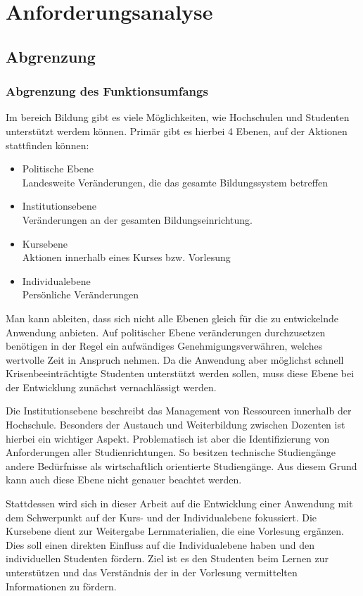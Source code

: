 \chapter{Anforderungsanalyse} %
\section{Abgrenzung}
\subsection{Abgrenzung des Funktionsumfangs}\label{sub:abgrenzung}
Im bereich Bildung gibt es viele Möglichkeiten, wie Hochschulen und Studenten unterstützt werdem können.
Primär gibt es hierbei 4 Ebenen, auf der Aktionen stattfinden können:
\begin{itemize}
    \item Politische Ebene\\
        Landesweite Veränderungen, die das gesamte Bildungssystem betreffen 
    \item Institutionsebene\\
        Veränderungen an der gesamten Bildungseinrichtung.
    \item Kursebene\\
        Aktionen innerhalb eines Kurses bzw. Vorlesung
    \item Individualebene\\
        Persönliche Veränderungen
\end{itemize}
Man kann ableiten, dass sich nicht alle Ebenen gleich für die zu entwickelnde Anwendung anbieten.
Auf politischer Ebene veränderungen durchzusetzen benötigen in der Regel ein aufwändiges Genehmigungsverwähren, welches wertvolle Zeit in Anspruch nehmen.
Da die Anwendung aber möglichst schnell Krisenbeeinträchtigte Studenten unterstützt werden sollen, muss diese Ebene bei der Entwicklung zunächst vernachlässigt werden.

Die Institutionsebene beschreibt das Management von Ressourcen innerhalb der Hochschule.
Besonders der Austauch und Weiterbildung zwischen Dozenten ist hierbei ein wichtiger Aspekt.
Problematisch ist aber die Identifizierung von Anforderungen aller Studienrichtungen.
So besitzen technische Studiengänge andere Bedürfnisse als wirtschaftlich orientierte Studiengänge.
Aus diesem Grund kann auch diese Ebene nicht genauer beachtet werden.

Stattdessen wird sich in dieser Arbeit auf die Entwicklung einer Anwendung mit dem Schwerpunkt auf der Kurs- und der Individualebene fokussiert.
Die Kursebene dient zur Weitergabe Lernmaterialien, die eine Vorlesung ergänzen.
Dies soll einen direkten Einfluss auf die Individualebene haben und den individuellen Studenten fördern.
Ziel ist es den Studenten beim Lernen zur unterstützen und das Verständnis der in der Vorlesung vermittelten Informationen zu fördern.  

